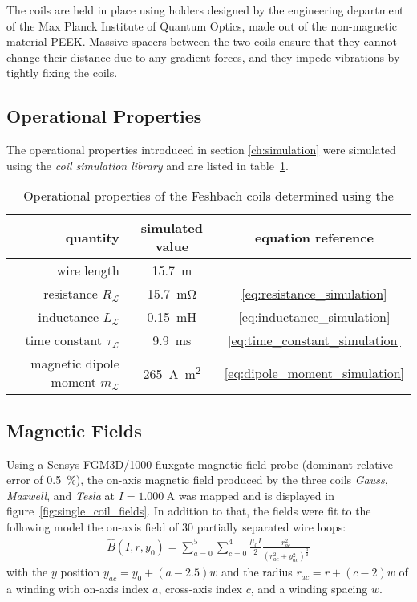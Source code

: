 The coils are held in place using holders designed by the engineering department of the Max Planck Institute of Quantum Optics, made out of the non-magnetic material PEEK. Massive spacers between the two coils ensure that they cannot change their distance due to any gradient forces, and they impede vibrations by tightly fixing the coils.

\subsection*{Operational Properties}
The operational properties introduced in section \ref{ch:simulation} were simulated using the \textit{coil simulation library} and are listed in table~\ref{tab:operational_properties}.

\begin{table}
    \centering
    \begin{tabular}{rcc}
        \toprule
        \textbf{quantity} & \textbf{simulated value}  & \textbf{equation reference} \\
        \toprule
        wire length & \SI{15.7}{\meter} & \\
        resistance $R_\mathcal{L}$ & \SI{15.7}{\milli\ohm} & \eqref {eq:resistance_simulation} \\
        inductance $L_\mathcal{L}$ & \SI{0.15}{\milli\henry} & \eqref{eq:inductance_simulation} \\ 
        time constant $\tau_\mathcal{L}$ & \SI{9.9}{\milli\second} & \eqref{eq:time_constant_simulation}\\
        magnetic dipole moment $m_\mathcal{L}$ & \SI{265}{\ampere\square\meter} & \eqref{eq:dipole_moment_simulation} \\
        \bottomrule
    \end{tabular}
    \caption{Operational properties of the Feshbach coils determined using the }
    \label{tab:operational_properties}
\end{table}


\subsection*{Magnetic Fields}
Using a Sensys FGM3D/1000 fluxgate magnetic field probe (dominant relative error of \SI{0.5}{\percent}), the on-axis magnetic field produced by the three coils \textit{Gauss}, \textit{Maxwell}, and \textit{Tesla} at $I = \SI{1.000}{\ampere}$ was mapped and is displayed in figure~\ref{fig:single_coil_fields}. In addition to that, the fields were fit to the following model the on-axis field of \SI{30}{} partially separated wire loops:
\begin{align}\label{eq:on_axis_field_model}
    \hat B(I, r, y_0) = \sum\limits_{a = 0}^5 \sum\limits_{c = 0}^4 \frac{\mu_0 I}{2} \frac{r_{ac}^2}{\left(r_{ac}^2 + y_{ac}^2\right)^\frac{3}{2}}
\end{align}
with the $y$ position $y_{ac} = y_0 + (a - 2.5) w$ and the radius $r_{ac} = r + (c-2)w$ of a winding with on-axis index $a$, cross-axis index $c$, and a winding spacing $w$.

